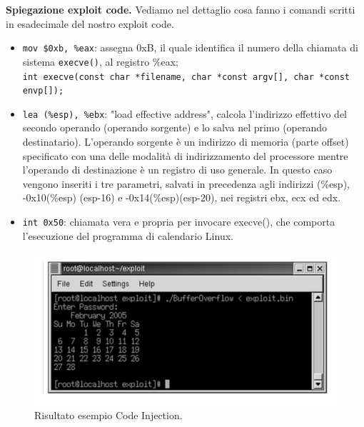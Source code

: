 \textbf{Spiegazione exploit code.} Vediamo nel dettaglio cosa fanno i comandi scritti in esadecimale del nostro exploit code. 
\begin{itemize}
    \item \verb|mov $0xb, %eax|: assegna 0xB, il quale identifica il numero della chiamata di sistema \verb|execve()|, al registro \%eax; \\
    \verb|int execve(const char *filename, char *const argv[], char *const envp[]);|
    \item \verb|lea (%esp), %ebx|: "load effective address", calcola l'indirizzo effettivo del secondo operando (operando sorgente) e lo salva nel primo (operando destinatario). L'operando sorgente è un indirizzo di memoria (parte offset) specificato con una delle modalità di indirizzamento del processore mentre l'operando di destinazione è un registro di uso generale. In questo caso vengono inseriti i tre parametri, salvati in precedenza agli indirizzi (\%esp), -0x10(\%esp) (esp-16) e -0x14(\%esp)(esp-20), nei registri ebx, ecx ed edx. 
    \item\verb|int 0x50|: chiamata vera e propria  per invocare execve(), che comporta l'esecuzione del programma di calendario Linux.
\end{itemize}
\begin{figure}[H]
	\centering
    \includegraphics[width=12cm, keepaspectratio]{santini/img/cap_2/risultato_ex_pass_code_inj.png}
	\caption{Risultato esempio Code Injection.}\label{fig:ris_es_pass_ok_code_inj}
\end{figure}




